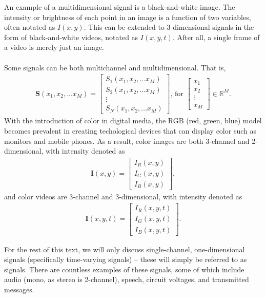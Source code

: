 \documentclass{report}
\begin{document}
An example of a multidimensional signal is a black-and-white image. The intensity or brightness of each point in an image is a function of two 
variables, often notated as $I(x,y)$. This can be extended to 3-dimensional signals in the form of black-and-white videos, notated as $I(x,y,t)$. 
After all, a single frame of a video is merely just an image.
\\ \\
Some signals can be both multichannel and multidimensional. That is, 
\begin{align}
    \mathbf{S}(x_1,x_2,...x_M) = 
    \begin{bmatrix}
        S_1(x_1,x_2,...x_M) \\
        S_2(x_1,x_2,...x_M) \\
        \vdots \\
        S_N(x_1,x_2,...x_M)
    \end{bmatrix}  \text{, for } 
    \begin{bmatrix}
        x_1 \\
        x_2 \\
        \vdots \\
        x_M
    \end{bmatrix} \in \mathbb{R}^M.
\end{align}
With the introduction of color in digital media, the RGB (red, green, blue) model becomes prevalent in 
creating techological devices that can display color such as monitors and mobile phones. As a result, color images are both 3-channel and 2-dimensional, with intensity 
denoted as 
\begin{align}
    \mathbf{I}(x,y)= 
    \begin{bmatrix}
        I_R(x,y) \\
        I_G(x,y) \\
        I_B(x,y)
    \end{bmatrix},
\end{align}
and color videos are 3-channel and 3-dimensional, with intensity denoted as
\begin{align}
    \mathbf{I}(x,y,t)= 
    \begin{bmatrix}
        I_R(x,y,t) \\
        I_G(x,y,t) \\
        I_B(x,y,t)
    \end{bmatrix}.
\end{align}

For the rest of this text, we will only discuss single-channel, one-dimensional signals (specifically time-varying signals) -- these will simply be referred to as signals. There are 
countless examples of these signals, some of which include audio (mono, as stereo is 2-channel), speech, circuit voltages, and transmitted messages.
\end{document}
